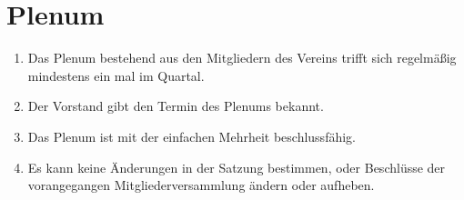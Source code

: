 \documentclass[ngerman]{scrartcl}
\begin{document}
\section{Plenum}
\label{sec:plenum}
\begin{enumerate}
 \item Das Plenum bestehend aus den Mitgliedern des Vereins trifft sich regelmäßig mindestens ein mal im Quartal.
 \item Der Vorstand gibt den Termin des Plenums bekannt.
 \item Das Plenum ist mit der einfachen Mehrheit beschlussfähig.
 \item Es kann keine Änderungen in der Satzung bestimmen, oder Beschlüsse der vorangegangen Mitgliederversammlung ändern oder aufheben.
\end{enumerate}
\end{document}
